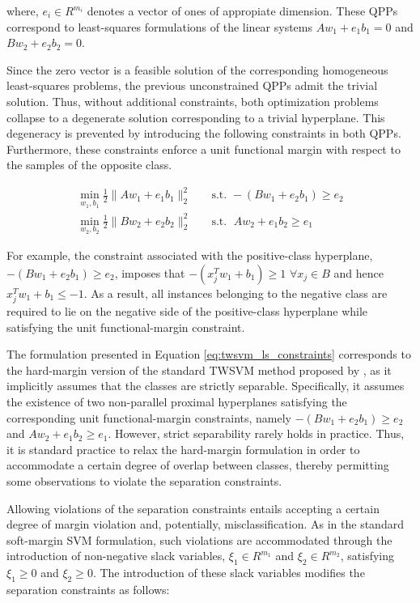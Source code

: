 \documentclass[12pt]{report} %
\begin{document}
where, $e_i \in R^{m_i}$ denotes a vector of ones of appropiate dimension. These QPPs correspond to least-squares formulations of the linear systems $Aw_1+e_1b_1 = 0$ and $Bw_2+e_2b_2 = 0$.

\newpage

Since the zero vector is a feasible solution of the corresponding homogeneous least-squares problems, the previous unconstrained QPPs admit the trivial solution. Thus, without additional constraints, both optimization problems collapse to a degenerate solution corresponding to a trivial hyperplane. This degeneracy is prevented by introducing the following constraints in both QPPs. Furthermore, these constraints enforce a unit functional margin with respect to the samples of the opposite class.

\begin{subequations}
\begin{align}
\min_{w_1,b_1} \frac{1}{2}\|Aw_1+e_1b_1\|_2^2
& \quad \text{s.t. } -(Bw_1+e_2b_1) \geq e_2 \\
\min_{w_2,b_2} \frac{1}{2}\|Bw_2+e_2b_2\|_2^2
& \quad \text{s.t.  }\; Aw_2+e_1b_2 \geq e_1
\end{align}
\label{eq:twsvm_ls_constraints}
\end{subequations}

For example, the constraint associated with the positive-class hyperplane, $-(Bw_1+e_2b_1) \geq e_2$, imposes that $-(x_j^Tw_1 + b_1) \geq 1\,\,\forall x_j\in B$ and hence $x_j^Tw_1+b_1 \leq -1$. As a result, all instances belonging to the negative class are required to lie on the negative side of the positive-class hyperplane while satisfying the unit functional-margin constraint.

The formulation presented in Equation \ref{eq:twsvm_ls_constraints} corresponds to the hard-margin version of the standard TWSVM method proposed by \cite{khemchandani2007twin}, as it implicitly assumes that the classes are strictly separable. Specifically, it assumes the existence of two non-parallel proximal hyperplanes satisfying the corresponding unit functional-margin constraints, namely $-(Bw_1+e_2b_1)\geq e_2$ and $Aw_2+e_1b_2 \geq e_1$. However, strict separability rarely holds in practice. Thus, it is standard practice to relax the hard-margin formulation in order to accommodate a certain degree of overlap between classes, thereby permitting some observations to violate the separation constraints.

Allowing violations of the separation constraints entails accepting a certain degree of margin violation and, potentially, misclassification. As in the standard soft-margin SVM formulation, such violations are accommodated through the introduction of non-negative slack variables, $\xi_1 \in R^{m_1}$ and $\xi_2 \in R^{m_2}$, satisfying $\xi_1\geq 0$ and $\xi_2 \geq 0$. The introduction of these slack variables modifies the separation constraints as follows:
\end{document}
